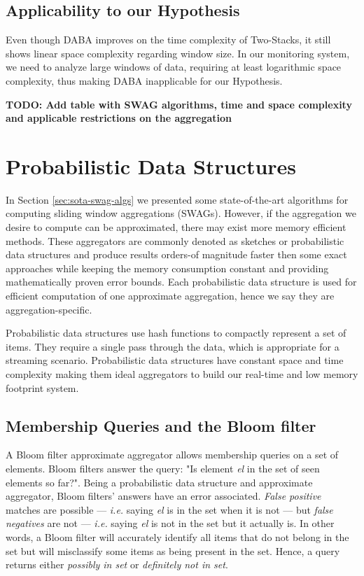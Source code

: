 \subsection*{Applicability to our Hypothesis}
Even though DABA improves on the time complexity of Two-Stacks, it still shows linear space complexity regarding window size. In our monitoring system, we need to analyze large windows of data, requiring at least logarithmic space complexity, thus making DABA inapplicable for our Hypothesis.


\textbf{TODO: Add table with SWAG algorithms, time and space complexity and applicable restrictions on the aggregation}

\section{Probabilistic Data Structures} \label{sec:pds}
In Section \ref{sec:sota-swag-algs} we presented some state-of-the-art algorithms for computing sliding window aggregations (SWAGs). However, if the aggregation we desire to compute can be approximated, there may exist more memory efficient methods. These aggregators are commonly denoted as sketches or probabilistic data structures and produce results orders-of magnitude faster then some exact approaches while keeping the memory consumption constant and providing mathematically proven error bounds. Each probabilistic data structure is used for efficient computation of one approximate aggregation, hence we say they are aggregation-specific.

Probabilistic data structures use hash functions to compactly represent a set of items. They require a single pass through the data, which is appropriate for a streaming scenario. Probabilistic data structures have constant space and time complexity \cite{Singh-PDS-BIGD} making them ideal aggregators to build our real-time and low memory footprint system. 

\subsection{Membership Queries and the Bloom filter} \label{sec:bloom}
A Bloom filter \cite{BLOOM-BLOOMFILTER} approximate aggregator allows membership queries on a set of elements. Bloom filters answer the query: "Is element \textit{el} in the set of seen elements so far?". Being a probabilistic data structure and approximate aggregator, Bloom filters' answers have an error associated. \textit{False positive} matches are possible --- \textit{i.e.} saying \textit{el} is in the set when it is not --- but \textit{false negatives} are not --- \textit{i.e.} saying \textit{el} is not in the set but it actually is. In other words, a Bloom filter will accurately identify all items that do not belong in the set but will misclassify some items as being present in the set. Hence, a query returns either \textit{possibly in set} or \textit{definitely not in set}.

